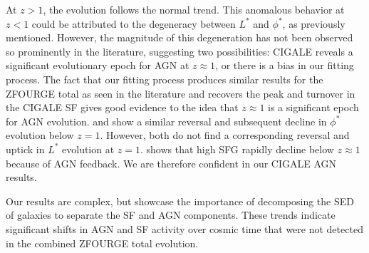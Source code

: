 At $z>1$, the evolution follows the normal trend. This anomalous behavior at $z<1$ could be attributed to the degeneracy between $L^{*}$ and $\phi^{*}$, as previously mentioned. However, the magnitude of this degeneration has not been observed so prominently in the literature, suggesting two possibilities: CIGALE reveals a significant evolutionary epoch for AGN at $z\approx1$, or there is a bias in our fitting process. The fact that our fitting process produces similar results for the ZFOURGE total as seen in the literature and recovers the peak and turnover in the CIGALE SF gives good evidence to the idea that $z\approx1$ is a significant epoch for AGN evolution. \cite{hopkins_observational_2007} and \cite{delvecchio_tracing_2014} show a similar reversal and subsequent decline in $\phi^{*}$ evolution below $z=1$. However, both do not find a corresponding reversal and uptick in $L^{*}$ evolution at $z=1$. \cite{katsianis_evolution_2017} shows that high SFG rapidly decline below $z\approx1$ because of AGN feedback. We are therefore confident in our CIGALE AGN results. 

Our results are complex, but showcase the importance of decomposing the SED of galaxies to separate the SF and AGN components. These trends indicate significant shifts in AGN and SF activity over cosmic time that were not detected in the combined ZFOURGE total evolution.




